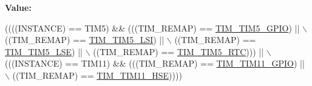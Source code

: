 {\bfseries Value\+:}
\begin{DoxyCode}
((((INSTANCE) == TIM5)  && (((TIM\_REMAP) == \hyperlink{group___t_i_m_ex___remap_ga8525d77a5f6fea05530e812e991e4d6d}{TIM\_TIM5\_GPIO})           || \(\backslash\)
                                    ((TIM\_REMAP) == \hyperlink{group___t_i_m_ex___remap_ga62000fc12a4ed5909723b881533a2f93}{TIM\_TIM5\_LSI})            || \(\backslash\)
                                    ((TIM\_REMAP) == \hyperlink{group___t_i_m_ex___remap_ga9f09de021d2f68730c952b4f0ebb82bc}{TIM\_TIM5\_LSE})            || \(\backslash\)
                                    ((TIM\_REMAP) == \hyperlink{group___t_i_m_ex___remap_ga93e312581ffb28601b36b4f8b240df79}{TIM\_TIM5\_RTC})))          || \(\backslash\)
         (((INSTANCE) == TIM11) && (((TIM\_REMAP) == \hyperlink{group___t_i_m_ex___remap_gac8a0bac87924350651da1957081bc9ae}{TIM\_TIM11\_GPIO})          || \(\backslash\)
                                    ((TIM\_REMAP) == \hyperlink{group___t_i_m_ex___remap_ga3b08e8165670e3034401099aada7712d}{TIM\_TIM11\_HSE}))))
\end{DoxyCode}
